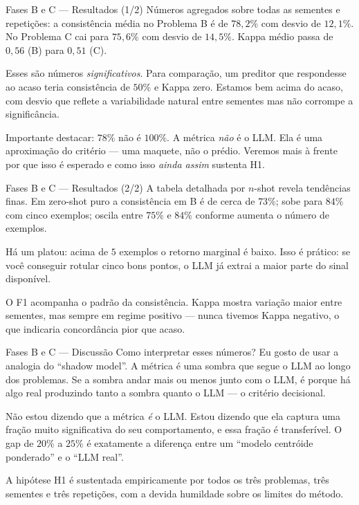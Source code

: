 \documentclass[aspectratio=169,10pt]{beamer}
\begin{document}
\begin{frame}{Fases B e C --- Resultados (1/2)}
  \small
  N\'umeros agregados sobre todas as sementes e repeti\c{c}\~oes: a consist\^encia m\'edia no Problema B
  \'e de $78{,}2\%$ com desvio de $12{,}1\%$. No Problema C cai para $75{,}6\%$ com desvio de $14{,}5\%$.
  Kappa m\'edio passa de $0{,}56$ (B) para $0{,}51$ (C).
  \medskip

  Esses s\~ao n\'umeros \emph{significativos}. Para compara\c{c}\~ao, um preditor que respondesse ao acaso
  teria consist\^encia de $50\%$ e Kappa zero. Estamos bem acima do acaso, com desvio que reflete a
  variabilidade natural entre sementes mas n\~ao corrompe a signific\^ancia.
  \medskip

  Importante destacar: $78\%$ n\~ao \'e $100\%$. A m\'etrica \emph{n\~ao} \'e o LLM. Ela \'e uma
  aproxima\c{c}\~ao do crit\'erio --- uma maquete, n\~ao o pr\'edio. Veremos mais \`a frente por que isso
  \'e esperado e como isso \emph{ainda assim} sustenta H1.
\end{frame}

\begin{frame}{Fases B e C --- Resultados (2/2)}
  \small
  A tabela detalhada por $n$-shot revela tend\^encias finas. Em zero-shot puro a consist\^encia em B \'e
  de cerca de $73\%$; sobe para $84\%$ com cinco exemplos; oscila entre $75\%$ e $84\%$ conforme aumenta
  o n\'umero de exemplos.
  \medskip

  H\'a um platou: acima de $5$ exemplos o retorno marginal \'e baixo. Isso \'e pr\'atico: se voc\^e
  conseguir rotular cinco bons pontos, o LLM j\'a extrai a maior parte do sinal dispon\'ivel.
  \medskip

  O F1 acompanha o padr\~ao da consist\^encia. Kappa mostra varia\c{c}\~ao maior entre sementes, mas sempre
  em regime positivo --- nunca tivemos Kappa negativo, o que indicaria concord\^ancia pior que acaso.
\end{frame}

\begin{frame}{Fases B e C --- Discuss\~ao}
  \small
  Como interpretar esses n\'umeros? Eu gosto de usar a analogia do ``shadow model''. A m\'etrica \'e
  uma sombra que segue o LLM ao longo dos problemas. Se a sombra andar mais ou menos junto com o LLM,
  \'e porque h\'a algo real produzindo tanto a sombra quanto o LLM --- o crit\'erio decisional.
  \medskip

  N\~ao estou dizendo que a m\'etrica \emph{\'e} o LLM. Estou dizendo que ela captura uma fra\c{c}\~ao
  muito significativa do seu comportamento, e essa fra\c{c}\~ao \'e transfer\'ivel. O gap de $20\%$ a
  $25\%$ \'e exatamente a diferen\c{c}a entre um ``modelo centr\'oide ponderado'' e o ``LLM real''.
  \medskip

  A hip\'otese H1 \'e sustentada empiricamente por todos os tr\^es problemas, tr\^es sementes e tr\^es
  repeti\c{c}\~oes, com a devida humildade sobre os limites do m\'etodo.
\end{frame}
\end{document}
